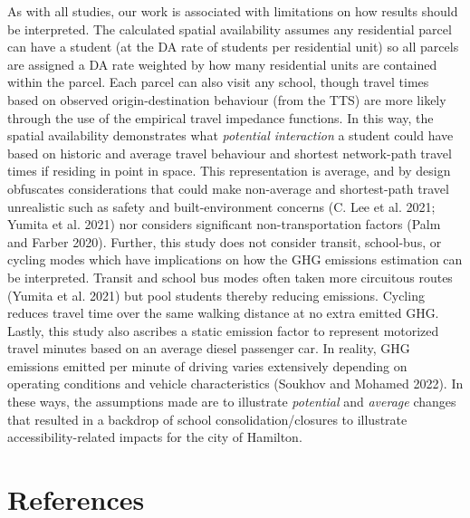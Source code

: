 \documentclass[
default
]{sn-jnl}
\begin{document}
As with all studies, our work is associated with limitations on how
results should be interpreted. The calculated spatial availability
assumes any residential parcel can have a student (at the DA rate of
students per residential unit) so all parcels are assigned a DA rate
weighted by how many residential units are contained within the parcel.
Each parcel can also visit any school, though travel times based on
observed origin-destination behaviour (from the TTS) are more likely
through the use of the empirical travel impedance functions. In this
way, the spatial availability demonstrates what \emph{potential
interaction} a student could have based on historic and average travel
behaviour and shortest network-path travel times if residing in point in
space. This representation is average, and by design obfuscates
considerations that could make non-average and shortest-path travel
unrealistic such as safety and built-environment concerns (C. Lee et al.
2021; Yumita et al. 2021) nor considers significant non-transportation
factors (Palm and Farber 2020). Further, this study does not consider
transit, school-bus, or cycling modes which have implications on how the
GHG emissions estimation can be interpreted. Transit and school bus
modes often taken more circuitous routes (Yumita et al. 2021) but pool
students thereby reducing emissions. Cycling reduces travel time over
the same walking distance at no extra emitted GHG. Lastly, this study
also ascribes a static emission factor to represent motorized travel
minutes based on an average diesel passenger car. In reality, GHG
emissions emitted per minute of driving varies extensively depending on
operating conditions and vehicle characteristics (Soukhov and Mohamed
2022). In these ways, the assumptions made are to illustrate
\emph{potential} and \emph{average} changes that resulted in a backdrop
of school consolidation/closures to illustrate accessibility-related
impacts for the city of Hamilton.

\pagebreak

\section{References}\label{references}
\end{document}
